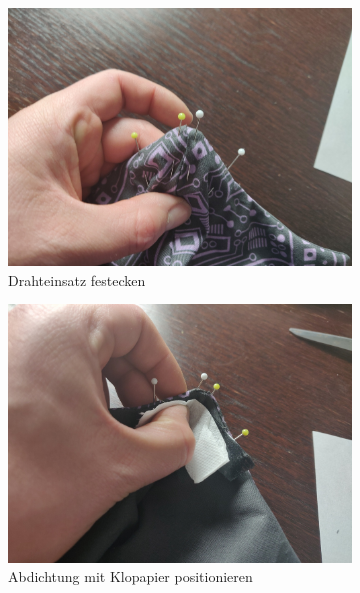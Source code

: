 \documentclass[12pt,parskip=full]{scrartcl}
\begin{document}
\begin{figure}[hp]
    \begin{subfigure}{0.48\textwidth}
        \centering
        \includegraphics[width = \linewidth]{Pictures/09_NoseParts/NoseParts05_resized.jpg}
        \caption{Drahteinsatz festecken}
        \label{Nose05}
    \end{subfigure}
    \begin{subfigure}{0.48\textwidth}
        \centering
        \includegraphics[width = \linewidth]{Pictures/09_NoseParts/NoseParts06_resized.jpg}
        \caption{Abdichtung mit Klopapier positionieren}
        \label{Nose06}
    \end{subfigure}
    \begin{subfigure}{0.48\textwidth}
        \centering

\end{subfigure}
\end{figure}
\end{document}
